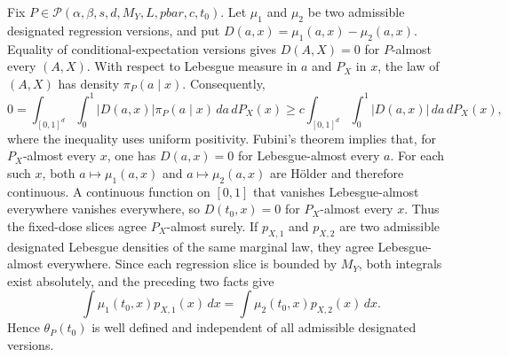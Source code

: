 Fix \(P\in\mathcal P(\alpha,\beta,s,d,M_Y,L,pbar,c,t_0)\). Let \(\mu_1\) and \(\mu_2\) be two admissible designated regression versions, and put \(D(a,x)=\mu_1(a,x)-\mu_2(a,x)\). Equality of conditional-expectation versions gives \(D(A,X)=0\) for \(P\)-almost every \((A,X)\). With respect to Lebesgue measure in \(a\) and \(P_X\) in \(x\), the law of \((A,X)\) has density \(\pi_P(a\mid x)\). Consequently, \[0=\int_{[0,1]^d}\int_0^1 \lvert D(a,x)\rvert\pi_P(a\mid x)\,da\,dP_X(x)\ge c\int_{[0,1]^d}\int_0^1\lvert D(a,x)\rvert\,da\,dP_X(x),\] where the inequality uses uniform positivity. Fubini's theorem implies that, for \(P_X\)-almost every \(x\), one has \(D(a,x)=0\) for Lebesgue-almost every \(a\). For each such \(x\), both \(a\mapsto\mu_1(a,x)\) and \(a\mapsto\mu_2(a,x)\) are Hölder and therefore continuous. A continuous function on \([0,1]\) that vanishes Lebesgue-almost everywhere vanishes everywhere, so \(D(t_0,x)=0\) for \(P_X\)-almost every \(x\). Thus the fixed-dose slices agree \(P_X\)-almost surely. If \(p_{X,1}\) and \(p_{X,2}\) are two admissible designated Lebesgue densities of the same marginal law, they agree Lebesgue-almost everywhere. Since each regression slice is bounded by \(M_Y\), both integrals exist absolutely, and the preceding two facts give \[\int\mu_1(t_0,x)p_{X,1}(x)\,dx=\int\mu_2(t_0,x)p_{X,2}(x)\,dx.\] Hence \(\theta_P(t_0)\) is well defined and independent of all admissible designated versions.